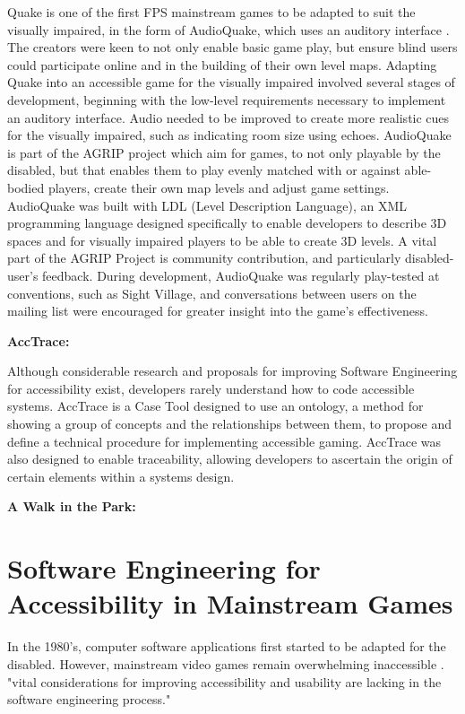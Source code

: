 \documentclass{scrartcl}
\begin{document}
Quake \cite{4} is one of the first FPS mainstream games to be adapted to suit the visually impaired, in the form of AudioQuake, which uses an auditory interface \cite{5}. The creators were keen to not only enable basic game play, but ensure blind users could participate online and in the building of their own level maps. Adapting Quake into an accessible game for the visually impaired involved several stages of development, beginning with the low-level requirements necessary to implement an auditory interface. Audio needed to be improved to create more realistic cues for the visually impaired, such as indicating room size using echoes. AudioQuake is part of the AGRIP project \cite{6} which aim for games, to not only playable by the disabled, but that enables them to play evenly matched with or against able-bodied players, create their own map levels and adjust game settings. AudioQuake was built with LDL (Level Description Language), an XML programming language designed specifically to enable developers to describe 3D spaces and for visually impaired players to be able to create 3D levels. A vital part of the AGRIP Project is community contribution, and particularly disabled-user’s feedback. During development, AudioQuake was regularly play-tested at conventions, such as Sight Village, and conversations between users on the mailing list were encouraged for greater insight into the game's effectiveness.

\textbf{AccTrace:}

Although considerable research and proposals for improving Software Engineering for accessibility exist, developers rarely understand how to code accessible systems. AccTrace \cite{12} is a Case Tool designed to use an ontology, a method for showing a group of concepts and the relationships between them, to propose and define a technical procedure for implementing accessible gaming. AccTrace was also designed to enable traceability, allowing developers to ascertain the origin of certain elements within a systems design. \cite{12}

\textbf{A Walk in the Park:}

\section{Software Engineering for Accessibility in Mainstream Games}
In the 1980's, computer software applications first started to be adapted for the disabled. However, mainstream video games remain overwhelming inaccessible . "vital considerations for improving accessibility and usability are lacking in the software engineering process." \cite{15}
\end{document}
